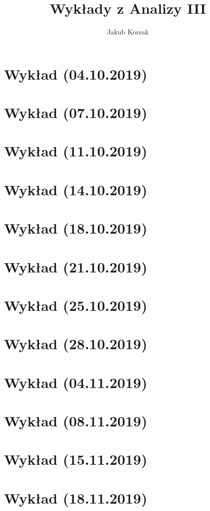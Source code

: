 \documentclass{article}
\title{Wykłady z Analizy III}
\author{Jakub Korsak}
\begin{document}
\maketitle

\pagebreak
\section{Wykład (04.10.2019)}

\pagebreak
\section{Wykład (07.10.2019)}

\pagebreak
\section{Wykład (11.10.2019)}

\pagebreak
\section{Wykład (14.10.2019)}

\pagebreak
\section{Wykład (18.10.2019)}

\pagebreak
\section{Wykład (21.10.2019)}

\pagebreak
\section{Wykład (25.10.2019)}

\pagebreak
\section{Wykład (28.10.2019)}

\pagebreak
\section{Wykład (04.11.2019)}

\pagebreak
\section{Wykład (08.11.2019)}

\pagebreak
\section{Wykład (15.11.2019)}

\pagebreak
\section{Wykład (18.11.2019)}

\end{document}
